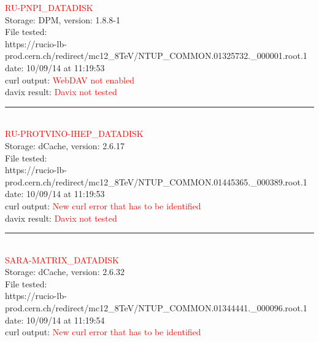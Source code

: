 \textcolor{red}{\normalsize{RU-PNPI\_DATADISK}}\\

Storage: DPM, version: 1.8.8-1\\

File tested:\\
\footnotesize{https://rucio-lb-prod.cern.ch/redirect/mc12\_8TeV/NTUP\_COMMON.01325732.\_000001.root.1}\\

date: 10/09/14 at 11:19:53\\

curl output:  \textcolor{red}{WebDAV not enabled}\\

davix result:  \textcolor{red}{Davix not tested}\\

\rule{\textwidth}{1pt}\\

\textcolor{red}{\normalsize{RU-PROTVINO-IHEP\_DATADISK}}\\

Storage: dCache, version: 2.6.17\\

File tested:\\
\footnotesize{https://rucio-lb-prod.cern.ch/redirect/mc12\_8TeV/NTUP\_COMMON.01445365.\_000389.root.1}\\

date: 10/09/14 at 11:19:53\\

curl output:  \textcolor{red}{New curl error that has to be identified}\\

davix result:  \textcolor{red}{Davix not tested}\\

\rule{\textwidth}{1pt}\\

\textcolor{red}{\normalsize{SARA-MATRIX\_DATADISK}}\\

Storage: dCache, version: 2.6.32\\

File tested:\\
\footnotesize{https://rucio-lb-prod.cern.ch/redirect/mc12\_8TeV/NTUP\_COMMON.01344441.\_000096.root.1}\\

date: 10/09/14 at 11:19:54\\

curl output:  \textcolor{red}{New curl error that has to be identified}\\

